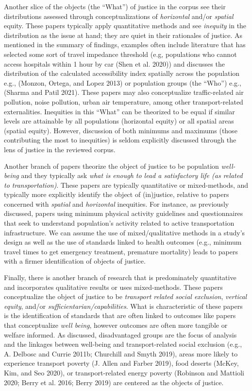 \documentclass[12pt, oneside]{report}
\begin{document}
Another slice of the objects (the ``What'') of justice in the corpus see
their distributions assessed through conceptualizations of
\emph{horizontal} and/or \emph{spatial} equity. These papers typically
apply quantitative methods and see \emph{inequity} in the distribution
as the issue at hand; they are quiet in their rationales of justice. As
mentioned in the summary of findings, examples often include literature
that has selected some sort of travel impedance threshold (e.g,
populations who cannot access hospitals within 1 hour by car (Shen et
al. 2020)) and discusses the distribution of the calculated
accessibility index spatially across the population e.g., (Monzon,
Ortega, and Lopez 2013) or population groups (the ``Who'') e.g., (Sharma
and Patil 2021). These papers may also conceptualize traffic-related air
pollution, noise pollution, urban air temperature, among other
transport-related externalities. Inequities in this ``What'' can be
theorized to be equal if similar levels are attainable by all
populations (horizontal equity) or all spatial areas (spatial equity).
However, discussion of both minimums and maximums (those contributing
the most to inequities) is seldom explicitly discussed through the lens
of justice in the reviewed corpus.

Another branch of papers theorize the object of justice to be population
\emph{well-being} and they typically ask \emph{what is enough to lead a
satisfactory life (as related to transportation)}. These papers are
typically quantitative or mixed-methods, and typically more explicitly
identify the object of (in)justice, relative to papers concerned with
\emph{spatial} and \emph{horizontal} inequities. For instance, as
previously discussed, papers using minimum physical activity guidelines
and questionnaires that seek to understand population's activity related
to active transportation infrastructure. We can assume the use of
mixed/qualitative methods in a study's design as well as the use of
standards linked to health outcomes (e.g., minimum travel times to get
emergency treatment, premature mortality) leads to papers with a firmer
identification of objects of justice.

Finally, there is another branch of research that is predominately
quantitative and incorporates qualitative results or uses mixed-methods.
These papers conceptualize the object of justice to be \emph{transport
related social exclusion}, \emph{vertical equity}, and/or
\emph{sufficientarian/capabilities}. What is characteristic of these
papers is the identification of standards that are often linked to
outcomes like papers that conceptualize \emph{well being}, however
outcomes are often more tangible or welfare informed. As discussed,
disadvantaged groups are the focus of analysis and the linkages between
well-being and transport-related social exclusion (e.g., A. Delbosc and
Currie 2011b; Churchill and Smyth 2019), areas more likely to experience
transport poverty (J. Allen and Farber 2019), food deserts (McKey, Kim,
and Seo 2020), or transport-related energy poverty (Robinson and
Mattioli 2020; Berry et al. 2016; Berry 2019) are centered as the
objects of justice.
\end{document}
